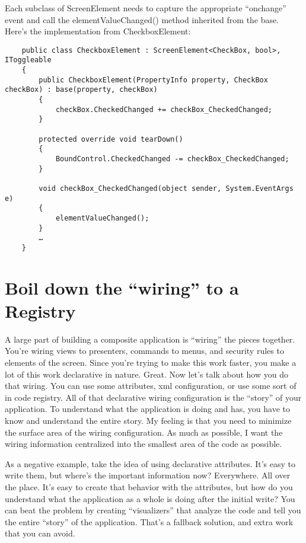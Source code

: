 \documentclass{article}
\begin{document}
{Each subclass of ScreenElement needs to capture the appropriate “onchange” event and call the elementValueChanged() method inherited from the base.  Here's the implementation from CheckboxElement:
\begin{lstlisting}
    public class CheckboxElement : ScreenElement<CheckBox, bool>, IToggleable
    {
        public CheckboxElement(PropertyInfo property, CheckBox checkBox) : base(property, checkBox)
        {
            checkBox.CheckedChanged += checkBox_CheckedChanged;
        }

        protected override void tearDown()
        {
            BoundControl.CheckedChanged -= checkBox_CheckedChanged;
        }

        void checkBox_CheckedChanged(object sender, System.EventArgs e)
        {
            elementValueChanged();
        }
        …
    }
\end{lstlisting}	

\section{ Boil down the “wiring” to a Registry } 

A large part of building a composite application is “wiring” the pieces together.  You're wiring views to presenters, commands to menus, and security rules to elements of the screen.  Since you're trying to make this work faster, you make a lot of this work declarative in nature.  Great.  Now let's talk about how you do that wiring.  You can use some attributes, xml configuration, or use some sort of in code registry.  All of that declarative wiring configuration is the “story” of your application.  To understand what the application is doing and has, you have to know and understand the entire story.  My feeling is that you need to minimize the surface area of the wiring configuration.  As much as possible, I want the wiring information centralized into the smallest area of the code as possible. 

As a negative example, take the idea of using declarative attributes.  It's easy to write them, but where's the important information now?  Everywhere.  All over the place.  It's easy to create that behavior with the attributes, but how do you understand what the application as a whole is doing after the initial write?  You can beat the problem by creating “visualizers” that analyze the code and tell you the entire “story” of the application.  That's a fallback solution, and extra work that you can avoid. 

}
\end{document}
